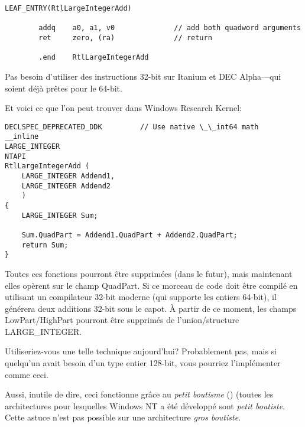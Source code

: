 \begin{lstlisting}[caption=DEC Alpha arch]
        LEAF_ENTRY(RtlLargeIntegerAdd)

        addq    a0, a1, v0              // add both quadword arguments
        ret     zero, (ra)              // return

        .end    RtlLargeIntegerAdd
\end{lstlisting}

Pas besoin d'utiliser des instructions 32-bit sur Itanium et DEC Alpha---qui
soient déjà prêtes pour le 64-bit.

Et voici ce que l'on peut trouver dans Windows Research Kernel:

\begin{lstlisting}[style=customc]
DECLSPEC_DEPRECATED_DDK         // Use native \_\_int64 math
__inline
LARGE_INTEGER
NTAPI
RtlLargeIntegerAdd (
    LARGE_INTEGER Addend1,
    LARGE_INTEGER Addend2
    )
{
    LARGE_INTEGER Sum;

    Sum.QuadPart = Addend1.QuadPart + Addend2.QuadPart;
    return Sum;
}
\end{lstlisting}

Toutes ces fonctions pourront être supprimées (dans le futur), mais maintenant elles
opèrent sur le champ QuadPart.
Si ce morceau de code doit être compilé en utilisant un compilateur 32-bit moderne
(qui supporte les entiers 64-bit), il générera deux additions 32-bit sous le capot.
À partir de ce moment, les champs LowPart/HighPart pourront être supprimés de
l'union/structure LARGE\_INTEGER.

Utiliseriez-vous une telle technique aujourd'hui?
Probablement pas, mais si quelqu'un avait besoin d'un type entier 128-bit, vous
pourriez l'implémenter comme ceci.

Aussi, inutile de dire, ceci fonctionne grâce au \emph{petit boutisme} ()
(toutes les architectures pour lesquelles Windows NT a été développé sont \emph{petit boutiste}.
Cette astuce n'est pas possible sur une architecture \emph{gros boutiste}.

